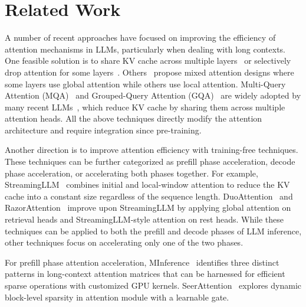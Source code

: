 \section{Related Work}
\label{sec:2-related}
A number of recent approaches have focused on improving the efficiency of attention mechanisms in LLMs, particularly when dealing with long contexts. One feasible solution is to share KV cache across multiple layers~\cite{crosslayerAtt2024} or selectively drop attention for some layers~\cite{slimgpt2024}. Others~\cite{yoco2024, block2024} propose mixed attention designs where some layers use global attention while others use local attention. Multi-Query Attention (MQA)~\cite{mqa2019} and Grouped-Query Attention (GQA)~\cite{gqa2023} are widely adopted by many recent LLMs~\cite{metaai2024, mistral2023, gemma2024}, which reduce KV cache by sharing them across multiple attention heads. All the above techniques directly modify the attention architecture and require integration since pre-training.

Another direction is to improve attention efficiency with training-free techniques. These techniques can be further categorized as prefill phase acceleration, decode phase acceleration, or accelerating both phases together. For example, StreamingLLM~\cite{mistral2023} combines initial and local-window attention to reduce the KV cache into a constant size regardless of the sequence length. 
DuoAttention~\cite{duoattention2024} and RazorAttention~\cite{razor2024} improve upon StreamingLLM by applying global attention on retrieval heads and StreamingLLM-style attention on rest heads. While these techniques can be applied to both the prefill and decode phases of LLM inference, other techniques focus on accelerating only one of the two phases.

For prefill phase attention acceleration, MInference~\cite{minference2024} identifies three distinct patterns in long-context 
attention matrices that can be harnessed for efficient sparse operations with customized GPU kernels.
SeerAttention~\cite{seerattention2024} explores dynamic block-level sparsity in attention module with a learnable gate.

